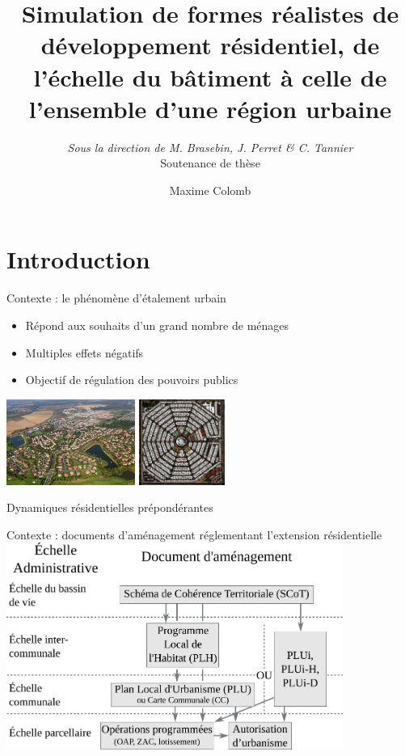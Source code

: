 \documentclass[xcolor=table]{beamer}
\title{Simulation de formes réalistes de développement résidentiel, de l'échelle du bâtiment à celle de l'ensemble d'une région urbaine}
\author{Maxime Colomb}
\subtitle{\textit{Sous la direction de M. Brasebin, J. Perret \& C. Tannier}
	\\Soutenance de thèse}
\begin{document}
\maketitle
\section{Introduction}
\begin{frame}{Contexte : le phénomène d'étalement urbain}
	\begin{block}{}
		\begin{itemize}
			\item Répond aux souhaits d'un grand nombre de ménages
			\item Multiples effets négatifs
			\item Objectif de régulation des pouvoirs publics
		\end{itemize}
		\includegraphics[height=2.8cm]{Images/consome.jpg}
		\includegraphics[height=2.8cm]{Images/sto.jpeg}
	\end{block}
	\begin{block}{}
		Dynamiques résidentielles prépondérantes %
	\end{block}
\end{frame}

\begin{frame}{Contexte : documents d'aménagement réglementant l'extension résidentielle} 
	\includegraphics[width=11cm]{Images/planification-globale-Prez.png}
\end{frame}
\end{document}
